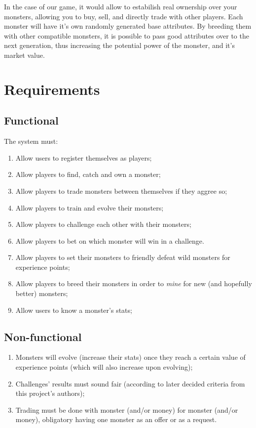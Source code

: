 \documentclass{article}
\begin{document}
    In the case of our game, it would allow to estabilish real ownership over
    your monsters, allowing you to buy, sell, and directly trade with other
    players.  Each monster will have it's own randomly generated base
    attributes. By breeding them with other compatible monsters, it is possible
    to pass good attributes over to the next generation, thus increasing the
    potential power of the monster, and it's market value.

    \section{Requirements}

    \subsection{Functional}

    The system must:

    \begin{enumerate}
        \item Allow users to register themselves as players;
        \item Allow players to find, catch and own a monster;
        \item Allow players to trade monsters between themselves if they aggree
            so;
        \item Allow players to train and evolve their monsters;
        \item Allow players to challenge each other with their monsters;
        \item Allow players to bet on which monster will win in a challenge.
        \item Allow players to set their monsters to friendly defeat wild
            monsters for experience points;
        \item Allow players to breed their monsters in order to \textit{mine}
            for new (and hopefully better) monsters;
        \item Allow users to know a monster's stats;
    \end{enumerate}

    \subsection{Non-functional}

    \begin{enumerate}
        \item Monsters will evolve (increase their stats) once they reach a
            certain value of experience points (which will also increase upon
            evolving);
        \item Challenges' results must sound fair (according to later decided
            criteria from this project's authors);
        \item Trading must be done with monster (and/or money) for monster
            (and/or money), obligatory having one monster as an offer or as a
            request.
    \end{enumerate}
\end{document}
